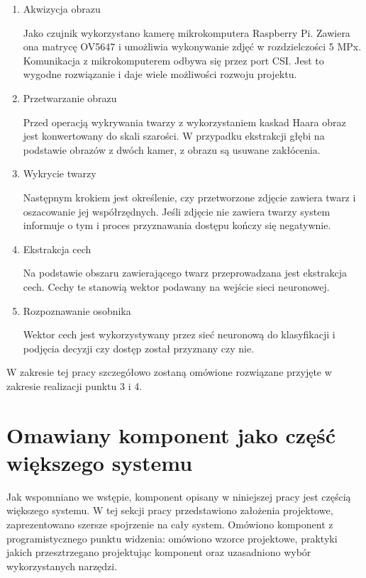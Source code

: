 \documentclass[oneside, eng]{mgr}
\begin{document}
\begin{enumerate}

\item Akwizycja obrazu
	
Jako czujnik wykorzystano kamerę mikrokomputera Raspberry Pi. Zawiera ona matrycę OV5647 i umożliwia wykonywanie zdjęć w rozdzielczości 5 MPx. Komunikacja z mikrokomputerem odbywa się przez port CSI. Jest to wygodne rozwiązanie i daje wiele możliwości rozwoju projektu. 
	
\item Przetwarzanie obrazu

Przed operacją wykrywania twarzy z wykorzystaniem kaskad Haara obraz jest konwertowany do skali szarości. W przypadku ekstrakcji głębi na podstawie obrazów z dwóch kamer, z obrazu są usuwane zakłócenia.

\item Wykrycie twarzy

Następnym krokiem jest określenie, czy przetworzone zdjęcie zawiera twarz i oszacowanie jej współrzędnych. Jeśli zdjęcie nie zawiera twarzy system informuje o tym i proces przyznawania dostępu kończy się negatywnie.

\item Ekstrakcja cech

Na podstawie obszaru zawierającego twarz przeprowadzana jest ekstrakcja cech. Cechy te stanowią wektor podawany na wejście sieci neuronowej.

\item Rozpoznawanie osobnika

Wektor cech jest wykorzystywany przez sieć neuronową do klasyfikacji i podjęcia decyzji czy dostęp został przyznany czy nie.

\end{enumerate} 

W zakresie tej pracy szczegółowo zostaną omówione rozwiązane przyjęte w zakresie realizacji punktu 3 i 4. 



\section{Omawiany komponent jako część większego systemu} 

Jak wspomniano we wstępie, komponent opisany w niniejszej pracy jest częścią większego systemu. W tej sekcji pracy przedstawiono założenia projektowe, zaprezentowano szersze spojrzenie na cały system. Omówiono komponent z programistycznego punktu widzenia: omówiono wzorce projektowe, praktyki jakich przesztrzegano projektując komponent oraz uzasadniono wybór wykorzystanych narzędzi.
\end{document}
